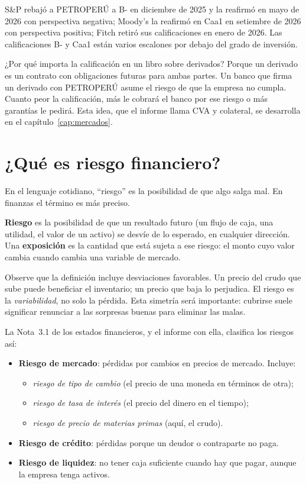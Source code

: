 \begin{informe}
S\&P rebajó a PETROPERÚ a B- en diciembre de 2025 y la reafirmó en mayo de 2026 con perspectiva negativa; Moody's la reafirmó en Caa1 en setiembre de 2026 con perspectiva positiva; Fitch retiró sus calificaciones en enero de 2026. Las calificaciones B- y Caa1 están varios escalones por debajo del grado de inversión.
\end{informe}

¿Por qué importa la calificación en un libro sobre derivados? Porque un derivado es un contrato con obligaciones futuras para ambas partes. Un banco que firma un derivado con PETROPERÚ asume el riesgo de que la empresa no cumpla. Cuanto peor la calificación, más le cobrará el banco por ese riesgo o más garantías le pedirá. Esta idea, que el informe llama CVA y colateral, se desarrolla en el capítulo~\ref{cap:mercados}.

\section{¿Qué es riesgo financiero?}

En el lenguaje cotidiano, \enquote{riesgo} es la posibilidad de que algo salga mal. En finanzas el término es más preciso.

\begin{definicion}
\textbf{Riesgo} es la posibilidad de que un resultado futuro (un flujo de caja, una utilidad, el valor de un activo) se desvíe de lo esperado, en cualquier dirección. Una \textbf{exposición} es la cantidad que está sujeta a ese riesgo: el monto cuyo valor cambia cuando cambia una variable de mercado.
\end{definicion}

Observe que la definición incluye desviaciones favorables. Un precio del crudo que sube puede beneficiar el inventario; un precio que baja lo perjudica. El riesgo es la \emph{variabilidad}, no solo la pérdida. Esta simetría será importante: cubrirse suele significar renunciar a las sorpresas buenas para eliminar las malas.

La Nota~3.1 de los estados financieros, y el informe con ella, clasifica los riesgos así:

\begin{itemize}
\item \textbf{Riesgo de mercado}: pérdidas por cambios en precios de mercado. Incluye:
  \begin{itemize}
  \item \emph{riesgo de tipo de cambio} (el precio de una moneda en términos de otra);
  \item \emph{riesgo de tasa de interés} (el precio del dinero en el tiempo);
  \item \emph{riesgo de precio de materias primas} (aquí, el crudo).
  \end{itemize}
\item \textbf{Riesgo de crédito}: pérdidas porque un deudor o contraparte no paga.
\item \textbf{Riesgo de liquidez}: no tener caja suficiente cuando hay que pagar, aunque la empresa tenga activos.
\end{itemize}

